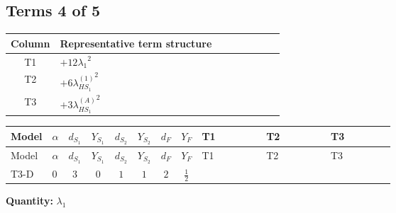 \documentclass[8pt]{article}
\begin{document}
\begin{landscape}
\subsection*{Terms 4 of 5}
\begin{center}
\begin{tabular}{@{}c >{\raggedright\arraybackslash}p{0.82\linewidth}@{}}
\toprule
Column & Representative term structure \\
\midrule
T1 & \(\displaystyle +12 {\lambda_1}^2\) \\
\midrule
T2 & \(\displaystyle +6 {\lambda_{HS_1}^{(1)}}^2\) \\
\midrule
T3 & \(\displaystyle +3 {\lambda_{HS_1}^{(A)}}^2\) \\
\midrule
\bottomrule
\end{tabular}
\end{center}
\smallskip
\tiny
\begin{longtable}{@{}llcccccc >{\raggedright\arraybackslash}p{0.21\linewidth} >{\raggedright\arraybackslash}p{0.21\linewidth} >{\raggedright\arraybackslash}p{0.21\linewidth}@{}}
\toprule
Model & $\alpha$ & $d_{S_1}$ & $Y_{S_1}$ & $d_{S_2}$ & $Y_{S_2}$ & $d_F$ & $Y_F$ & T1 & T2 & T3 \\
\midrule
\endfirsthead
\toprule
Model & $\alpha$ & $d_{S_1}$ & $Y_{S_1}$ & $d_{S_2}$ & $Y_{S_2}$ & $d_F$ & $Y_F$ & T1 & T2 & T3 \\
\midrule
\endhead
T3-D & $0$ & $3$ & $0$ & $1$ & $1$ & $2$ & $\frac{1}{2}$ & \scriptsize\adjustbox{max width=\linewidth}{$\begin{gathered} +12 {\lambda_1}^2\end{gathered}$} & \scriptsize\adjustbox{max width=\linewidth}{$\begin{gathered} +6 {\lambda_{HS_1}^{(1)}}^2\end{gathered}$} & \scriptsize\adjustbox{max width=\linewidth}{$\begin{gathered} +3 {\lambda_{HS_1}^{(A)}}^2\end{gathered}$} \\
\midrule
\bottomrule
\end{longtable}
\clearpage
\noindent\textbf{Quantity: }$\lambda_1$\par\smallskip

\end{landscape}
\end{document}
